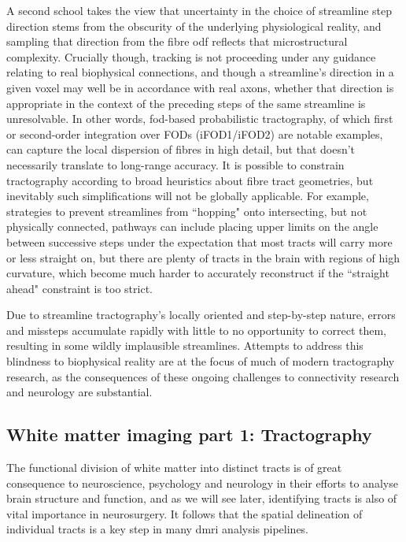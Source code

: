 A second school takes the view that uncertainty in the choice of streamline step direction stems from the obscurity of the underlying physiological reality, and sampling that direction from the fibre \gls{odf} reflects that microstructural complexity.
Crucially though, tracking is not proceeding under any guidance relating to real biophysical connections, and though a streamline's direction in a given voxel may well be in accordance with real axons, whether that direction is appropriate in the context of the preceding steps of the same streamline is unresolvable.
In other words, \gls{fod}-based probabilistic tractography, of which first or second-order integration over FODs (iFOD1/iFOD2)\autocite{Tournier2012,Tournier2010} are notable examples, can capture the local dispersion of fibres in high detail, but that doesn't necessarily translate to long-range accuracy.
It is possible to constrain tractography according to broad heuristics about fibre tract geometries, but inevitably such simplifications will not be globally applicable.
For example, strategies to prevent streamlines from ``hopping" onto intersecting, but not physically connected, pathways can include placing upper limits on the angle between successive steps under the expectation that most tracts will carry more or less straight on, but there are plenty of tracts in the brain with regions of high curvature, which become much harder to accurately reconstruct if the ``straight ahead" constraint is too strict.

Due to streamline tractography's locally oriented and step-by-step nature, errors and missteps accumulate rapidly with little to no opportunity to correct them, resulting in some wildly implausible streamlines.
Attempts to address this blindness to biophysical reality are at the focus of much of modern tractography research\autocite{Bastiani2017,Rheault2019,Aydogan2021}, as the consequences of these ongoing challenges to connectivity research and neurology are substantial\autocite{Schilling2019, Yang2021, Grisot2021}.

\subsection{White matter imaging part 1: Tractography}

The functional division of white matter into distinct tracts is of great consequence to neuroscience, psychology and neurology in their efforts to analyse brain structure and function, and as we will see later, identifying tracts is also of vital importance in neurosurgery.
It follows that the spatial delineation of individual tracts is a key step in many \gls{dmri} analysis pipelines.


